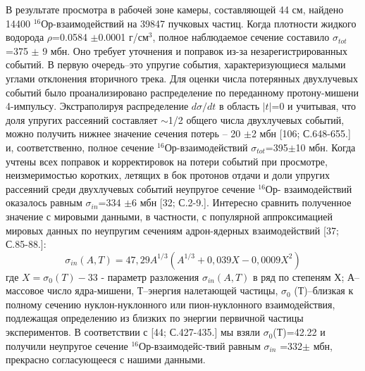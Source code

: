 \documentclass[fontsize=14pt]{scrreport}
\begin{document}
В результате просмотра в рабочей зоне камеры, составляющей 44 см,
найдено 14400 $^{16}$Ор-взаимодействий на 39847 пучковых частиц. Когда плотности жидкого водорода $\rho$=0.0584 $\pm$0.0001 г/см$^{3}$, полное наблюдаемое сечение составило $\sigma_{tot}$=375 $\pm$ 9 мбн. Оно требует уточнения и поправок из-за незарегистрированных событий. В первую очередь–это упругие события,
характеризующиеся малыми углами отклонения вторичного трека. Для
оценки числа потерянных двухлучевых событий было проанализировано
распределение по переданному протону-мишени 4-импульсу. Экстраполируя
распределение $d\sigma/dt$ в область $|t|$=0 и учитывая, что доля упругих рассеяний составляет $\sim$1/2 общего числа двухлучевых событий, можно получить нижнее значение сечения потерь – 20 $\pm$2 мбн [106; С.648-655.] и, соответственно, полное сечение $^{16}$Ор-взаимодействий $\sigma_{tot}$=395$\pm$10 мбн. Когда
учтены всех поправок и корректировок на потери событий при просмотре, неизмеримостью коротких, летящих в бок протонов отдачи и доли упругих
рассеяний среди двухлучевых событий неупругое сечение $^{16}$Ор-
взаимодействий оказалось равным $\sigma_{in}$=334 $\pm$6 мбн [32; С.2-9.]. Интересно сравнить полученное значение с мировыми данными, в частности, с популярной аппроксимацией мировых данных по неупругим сечениям адрон-ядерных взаимодействий [37; С.85-88.]:
\begin{equation}
    \sigma_{in}(A,T) = 47,29 A^{1/3}(A^{1/3} + 0,039 X - 0,0009X^{2})
\end{equation}
где $X=\sigma_{0}(T)-33$ - параметр разложения $\sigma_{in}(A,T)$ в ряд по степеням Х; А–массовое число ядра-мишени, Т–энергия налетающей частицы, $\sigma_{0}$ (Т)–близкая к полному сечению нуклон-нуклонного или пион-нуклонного взаимодействия, подлежащая определению из близких по энергии первичной частицы экспериментов. В соответствии с [44; С.427-435.] мы взяли $\sigma_{0}$(Т)=42.22 и получили неупругое сечение $^{16}$Ор-взаимодейс-твий равным $\sigma_{in}$ =332$\pm$ мбн, прекрасно согласующееся с нашими данными.
\end{document}
